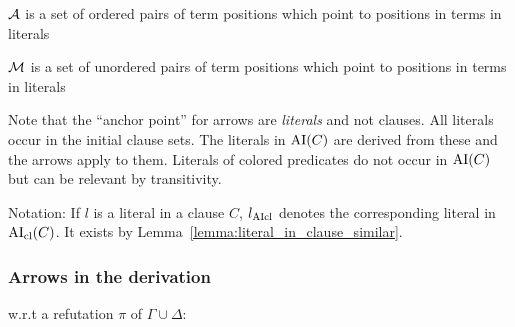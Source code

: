 \documentclass[,%
	paper=a4,%
	DIV14, %
	twoside=false,%
	liststotoc,
	bibtotoc,
	draft=false,%
	numbers=noendperiod
]{scrartcl}
\begin{document}
$\operatorname{\mathcal{A}}$ is a set of ordered pairs of term positions which point to positions in terms in literals

$\operatorname{\operatorname{\mathcal{M}}}$ is a set of unordered pairs of term positions which point to positions in terms in literals

Note that the ``anchor point'' for arrows are \emph{literals} and not clauses.
All literals occur in the initial clause sets.
The literals in $\operatorname{AI}(C)$ are derived from these and the arrows apply to them.
Literals of colored predicates do not occur in $\operatorname{AI}(C)$ but can be relevant by transitivity.

Notation: If $l$ is a literal in a clause $C$, $l_{\operatorname{AIcl}}$ denotes the corresponding literal in $\operatorname{AI}_\mathrm{cl}(C)$. It exists by Lemma~\ref{lemma:literal_in_clause_similar}.

\subsubsection{Arrows in the derivation}
w.r.t a refutation $\pi$ of $\Gamma \cup \Delta$:
\end{document}
